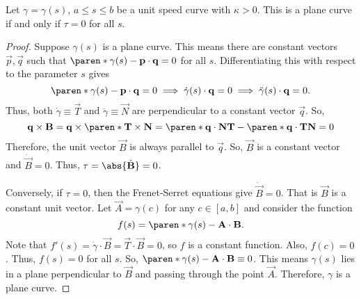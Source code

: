 \documentclass[11pt]{penrose}
\newcommand{\vT}{\vec{T}}
\newcommand{\vN}{\vec{N}}
\newcommand{\vB}{\vec{B}}
\begin{document}
\begin{nthm}
    Let $\gamma = \gamma(s)$, $a \leq s \leq b$ be a unit speed curve with $\kappa > 0$. This is a plane curve if and only if $\tau = 0$ for all $s$.
\end{nthm}
\begin{proof}
    Suppose $\gamma(s)$ is a plane curve. This means there are constant vectors $\vec{p}, \vec{q}$ such that $\paren*{\gamma(s) - \vec{p}} \cdot \vec{q} = 0$ for all $s$. Differentiating this with respect to the parameter $s$ gives
    \begin{equation}
        \paren*{\gamma(s) - \vec{p}} \cdot \vec{q} = 0
        \implies
        \dot{\gamma}(s) \cdot \vec{q} = 0
        \implies
        \ddot{\gamma}(s) \cdot \vec{q} = 0.
    \end{equation}
    Thus, both $\dot{\gamma} \equiv \vT$ and $\ddot{\gamma} \equiv \vN$ are perpendicular to a constant vector $\vec{q}$. So,
    \begin{equation}
         \vec{q} \times \vB
        = \vec{q} \times \paren*{\vT \times \vN}
        = \paren*{\vec{q} \cdot \vN} \vT - \paren*{\vec{q} \cdot \vT} \vN
        = 0
    \end{equation}
    Therefore, the unit vector $\vB$ is always parallel to $\vec{q}$. So, $\vB$ is a constant vector and $\dot{\vB} = 0$. Thus, $\tau = \abs{\dot{\vB}} = 0$.

    Conversely, if $\tau = 0$, then the Frenet-Serret equations give $\dot{\vB} = 0$. That is $\vB$ is a constant unit vector. Let $\vec{A} = \gamma(c)$ for any $c \in [a, b]$ and consider the function
    \begin{equation}
        f(s) = \paren*{\gamma(s) - \vec{A}} \cdot \vB.
    \end{equation}
    Note that $f'(s) = \dot{\gamma} \cdot \vB = \vT \cdot \vB = 0$, so $f$ is a constant function. Also, $f(c) = 0$. Thus, $f(s) = 0$ for all $s$. So, $\paren*{\gamma(s) - \vec{A}} \cdot \vB \equiv 0$. This means $\gamma(s)$ lies in a plane perpendicular to $\vB$ and passing through the point $\vec{A}$. Therefore, $\gamma$ is a plane curve.
\end{proof}
\end{document}
